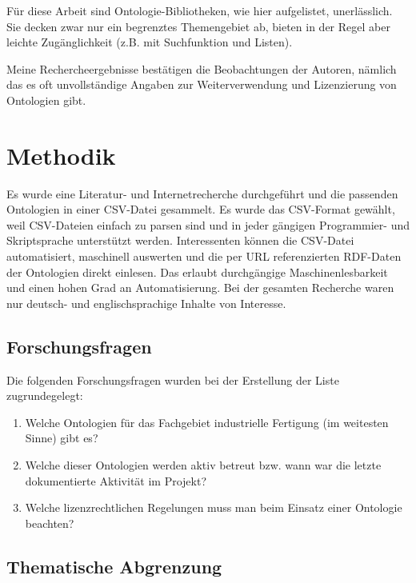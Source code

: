 \documentclass{article}
\begin{document}
Für diese Arbeit sind Ontologie-Bibliotheken, wie hier aufgelistet, unerlässlich.
Sie decken zwar nur ein begrenztes Themengebiet ab, bieten in der Regel aber leichte Zugänglichkeit (z.B. mit Suchfunktion und Listen).

Meine Rechercheergebnisse bestätigen die Beobachtungen der Autoren, nämlich das es oft unvollständige Angaben zur Weiterverwendung und Lizenzierung von Ontologien gibt.

\section{Methodik}

Es wurde eine Literatur- und Internetrecherche durchgeführt und die passenden Ontologien in einer CSV-Datei gesammelt.
Es wurde das CSV-Format gewählt, weil CSV-Dateien einfach zu parsen sind und in jeder gängigen Programmier- und Skriptsprache unterstützt werden.
Interessenten können die CSV-Datei automatisiert, maschinell auswerten und die per URL referenzierten RDF-Daten der Ontologien direkt einlesen.
Das erlaubt durchgängige Maschinenlesbarkeit und einen hohen Grad an Automatisierung.
Bei der gesamten Recherche waren nur deutsch- und englischsprachige Inhalte von Interesse.

\subsection{Forschungsfragen}

Die folgenden Forschungsfragen wurden bei der Erstellung der Liste zugrundegelegt:

\begin{enumerate}
    \item Welche Ontologien für das Fachgebiet industrielle Fertigung (im weitesten Sinne) gibt es?
    \item Welche dieser Ontologien werden aktiv betreut bzw. wann war die letzte dokumentierte Aktivität im Projekt?
    \item Welche lizenzrechtlichen Regelungen muss man beim Einsatz einer Ontologie beachten?
\end{enumerate}

\subsection{Thematische Abgrenzung}
\end{document}
